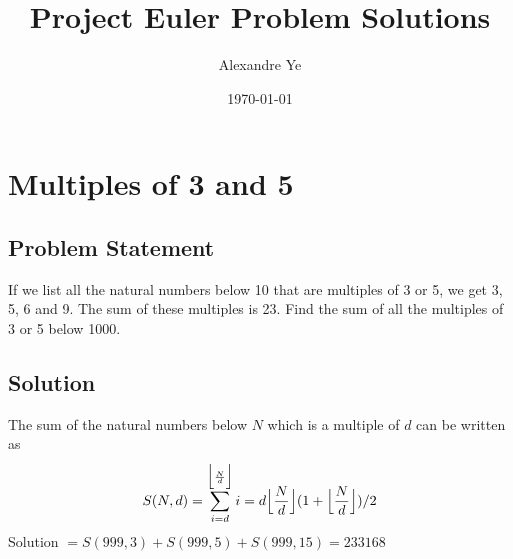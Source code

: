 \documentclass[12pt]{article}
\title{Project Euler Problem Solutions}
\author{Alexandre Ye}
\date{\today}
\begin{document}
\maketitle
\tableofcontents
\section{Multiples of 3 and 5}
\subsection{Problem Statement}
If we list all the natural numbers below 10 that are multiples of 3 or 5, we get 3, 5, 6 and 9. The sum of these multiples is 23. 
Find the sum of all the multiples of 3 or 5 below 1000.
\subsection{Solution}
 The sum of the natural numbers below $N$ which is a multiple of $d$ can be written as 
$$S(N,d) = \sum_{i=d}^{\Bigl\lfloor{\frac{N}{d}}\Bigr\rfloor}{i}=d\Bigl\lfloor\frac{N}{d}\Bigr\rfloor(1+\Bigl\lfloor\frac{N}{d}\Bigr\rfloor)/2$$
Solution $= S(999, 3) + S(999, 5) + S(999, 15) = 233168$
\end{document}
